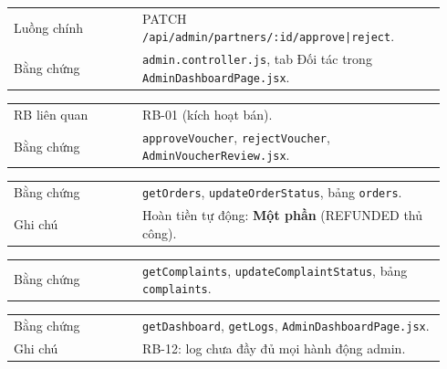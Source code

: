 \begin{longtable}{>{\raggedright\arraybackslash}p{0.28\linewidth}>{\raggedright\arraybackslash}p{0.66\linewidth}}
Luồng chính & PATCH \texttt{/api/admin/partners/:id/approve|reject}.\\
Bằng chứng & \texttt{admin.controller.js}, tab Đối tác trong \texttt{AdminDashboardPage.jsx}.\\
\end{longtable}

\begin{longtable}{>{\raggedright\arraybackslash}p{0.28\linewidth}>{\raggedright\arraybackslash}p{0.66\linewidth}}
RB liên quan & RB-01 (kích hoạt bán).\\
Bằng chứng & \texttt{approveVoucher}, \texttt{rejectVoucher}, \texttt{AdminVoucherReview.jsx}.\\
\end{longtable}

\begin{longtable}{>{\raggedright\arraybackslash}p{0.28\linewidth}>{\raggedright\arraybackslash}p{0.66\linewidth}}
Bằng chứng & \texttt{getOrders}, \texttt{updateOrderStatus}, bảng \texttt{orders}.\\
Ghi chú & Hoàn tiền tự động: \textbf{Một phần} (REFUNDED thủ công).\\
\end{longtable}

\begin{longtable}{>{\raggedright\arraybackslash}p{0.28\linewidth}>{\raggedright\arraybackslash}p{0.66\linewidth}}
Bằng chứng & \texttt{getComplaints}, \texttt{updateComplaintStatus}, bảng \texttt{complaints}.\\
\end{longtable}

\begin{longtable}{>{\raggedright\arraybackslash}p{0.28\linewidth}>{\raggedright\arraybackslash}p{0.66\linewidth}}
Bằng chứng & \texttt{getDashboard}, \texttt{getLogs}, \texttt{AdminDashboardPage.jsx}.\\
Ghi chú & RB-12: log chưa đầy đủ mọi hành động admin.\\
\end{longtable}

